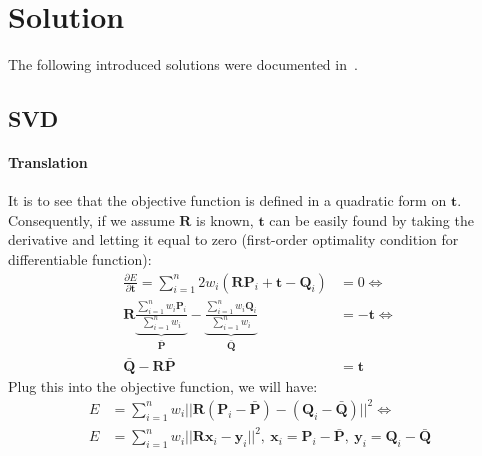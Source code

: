 \documentclass[a4paper]{report}
\begin{document}
\section{Solution}
The following introduced solutions were documented in~\cite{sorkine2017least}.

\subsection{SVD}
\paragraph{Translation} It is to see that the objective function is defined in a quadratic form on $\mathbf{t}$. Consequently, if we assume $\mathbf{R}$ is known, $\mathbf{t}$ can be easily found by taking the derivative and letting it equal to zero (first-order optimality condition for differentiable function):
\begin{align*}
\frac{\partial E}{\partial \mathbf{t}}=\sum_{i=1}^{n} 2w_i(\mathbf{RP}_i+\mathbf{t}-\mathbf{Q}_i)&=0 \Leftrightarrow \\
\mathbf{R}\underbrace{\frac{\sum_{i=1}^{n} w_i\mathbf{P}_i}{\sum_{i=1}^{n} w_i}}_{\bar{\mathbf{P}}} - \underbrace{\frac{\sum_{i=1}^{n} w_i\mathbf{Q}_i}{\sum_{i=1}^{n} w_i}}_{\bar{\mathbf{Q}}} &= -\mathbf{t} \Leftrightarrow \\ 
\bar{\mathbf{Q}}  - \mathbf{R}\bar{\mathbf{P}} &=\mathbf{t}
\end{align*}
Plug this into the objective function, we will have:
\begin{align*}
E &= \sum_{i=1}^{n} w_i||\mathbf{R}(\mathbf{P}_i-\bar{\mathbf{P}})-(\mathbf{Q}_i-\bar{\mathbf{Q}})||^2 \Leftrightarrow \\ 
E &= \sum_{i=1}^{n} w_i||\mathbf{R}\mathbf{x}_i-\mathbf{y}_i||^2,\ \mathbf{x}_i = \mathbf{P}_i-\bar{\mathbf{P}},\ \mathbf{y}_i =\mathbf{Q}_i-\bar{\mathbf{Q}}
\end{align*}
\end{document}
